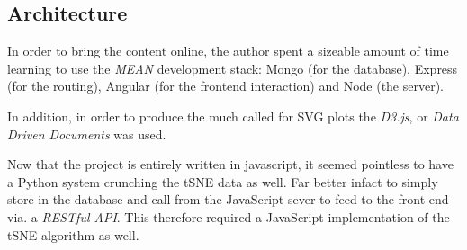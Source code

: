 \documentclass[a4paper,11pt,titlepage]{article}
\begin{document}
	\begin{figure}[H]
    			\centering	
    			\qquad
    			\caption{ }%
    			\label{fig:iter2}
	\end{figure}		
		
	\subsection{Architecture}
		In order to bring the content online, the author spent a sizeable amount of time learning to use the \textit{MEAN} development stack: Mongo (for the database), Express (for the routing), Angular (for the frontend interaction) and Node (the server). 
	\par 
	In addition, in order to produce the much called for SVG plots the \textit{D3.js}, or \textit{Data Driven Documents} was used. 
	\par 
	Now that the project is entirely written in javascript, it seemed pointless to have a Python system crunching the tSNE data as well. Far better infact to simply store in the database and call from the JavaScript sever to feed to the front end via. a \textit{RESTful API}. This therefore required a JavaScript implementation of the tSNE algorithm as well. 
\end{document}
